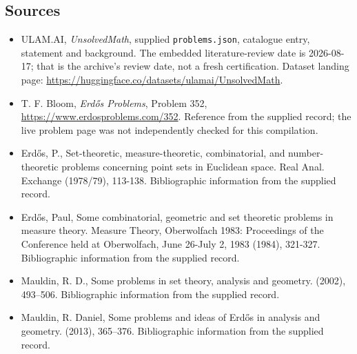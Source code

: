 \documentclass[11pt,a4paper]{article}
\begin{document}
\subsection{Sources}

{\small

\begin{itemize}

\item[\hypertarget{source:statement:1}{S1}] ULAM.AI, \emph{UnsolvedMath}, supplied \texttt{problems.json}, catalogue entry, statement and background. The embedded literature-review date is 2026-08-17; that is the archive’s review date, not a fresh certification. Dataset landing page: \url{https://huggingface.co/datasets/ulamai/UnsolvedMath}.

\item[\hypertarget{source:statement:2}{S2}] T. F. Bloom, \emph{Erdős Problems}, Problem 352, \url{https://www.erdosproblems.com/352}. Reference from the supplied record; the live problem page was not independently checked for this compilation.

\item[\hypertarget{source:statement:3}{S3}] Erd\H{o}s, P., Set-theoretic, measure-theoretic, combinatorial, and number-theoretic problems concerning point sets in Euclidean space. Real Anal. Exchange (1978/79), 113-138. Bibliographic information from the supplied record.

\item[\hypertarget{source:statement:4}{S4}] Erd\H{o}s, Paul, Some combinatorial, geometric and set theoretic problems in measure theory. Measure Theory, Oberwolfach 1983: Proceedings of the Conference held at Oberwolfach, June 26-July 2, 1983 (1984), 321-327. Bibliographic information from the supplied record.

\item[\hypertarget{source:statement:5}{S5}] Mauldin, R. D., Some problems in set theory, analysis and geometry. (2002), 493--506. Bibliographic information from the supplied record.

\item[\hypertarget{source:statement:6}{S6}] Mauldin, R. Daniel, Some problems and ideas of {E}rd\H{o}s in analysis and geometry. (2013), 365--376. Bibliographic information from the supplied record.

\end{itemize}

}

\label{end:statement}
\end{document}
